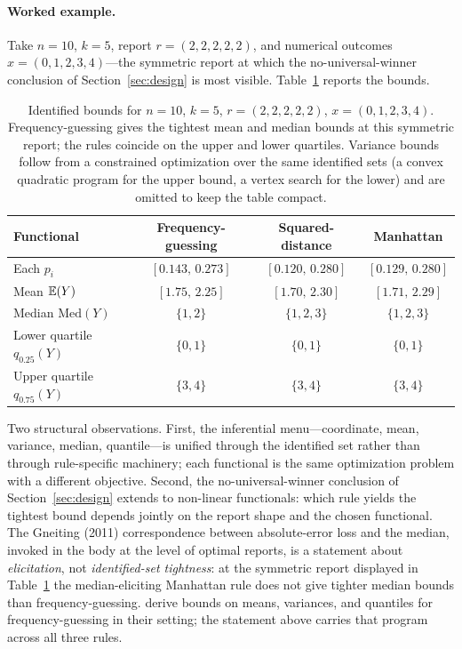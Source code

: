 \paragraph{Worked example.}
Take \(n=10\), \(k=5\), report \(r=(2,2,2,2,2)\), and numerical outcomes \(x=(0,1,2,3,4)\)---the symmetric report at which the no-universal-winner conclusion of Section~\ref{sec:design} is most visible. Table~\ref{tab:functional-menu} reports the bounds.

\begin{table}[h]
\centering
\small
\begin{tabular}{lccc}
\hline
Functional & Frequency-guessing & Squared-distance & Manhattan\\
\hline
Each \(p_i\)                                  & \([0.143,\,0.273]\) & \([0.120,\,0.280]\) & \([0.129,\,0.280]\)\\
Mean \(\mathbb{E}(Y)\)                                & \([1.75,\,2.25]\)   & \([1.70,\,2.30]\)   & \([1.71,\,2.29]\)\\
Median \(\mathrm{Med}(Y)\)                    & \(\{1,2\}\)         & \(\{1,2,3\}\)       & \(\{1,2,3\}\)\\
Lower quartile \(q_{0.25}(Y)\)                & \(\{0,1\}\)         & \(\{0,1\}\)         & \(\{0,1\}\)\\
Upper quartile \(q_{0.75}(Y)\)                & \(\{3,4\}\)         & \(\{3,4\}\)         & \(\{3,4\}\)\\
\hline
\end{tabular}
\caption{Identified bounds for \(n=10\), \(k=5\), \(r=(2,2,2,2,2)\), \(x=(0,1,2,3,4)\). Frequency-guessing gives the tightest mean and median bounds at this symmetric report; the rules coincide on the upper and lower quartiles. Variance bounds follow from a constrained optimization over the same identified sets (a convex quadratic program for the upper bound, a vertex search for the lower) and are omitted to keep the table compact.}
\label{tab:functional-menu}
\end{table}

Two structural observations. First, the inferential menu---coordinate, mean, variance, median, quantile---is unified through the identified set rather than through rule-specific machinery; each functional is the same optimization problem with a different objective. Second, the no-universal-winner conclusion of Section~\ref{sec:design} extends to non-linear functionals: which rule yields the tightest bound depends jointly on the report shape and the chosen functional. The Gneiting (2011) correspondence between absolute-error loss and the median, invoked in the body at the level of optimal reports, is a statement about \emph{elicitation}, not \emph{identified-set tightness}: at the symmetric report displayed in Table~\ref{tab:functional-menu} the median-eliciting Manhattan rule does not give tighter median bounds than frequency-guessing. \citet{SchlagTremewan2021} derive bounds on means, variances, and quantiles for frequency-guessing in their setting; the statement above carries that program across all three rules.

